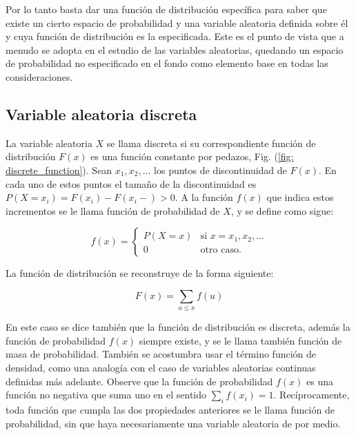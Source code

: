 Por lo tanto basta dar una función de distribución específica para saber que
existe un cierto espacio de probabilidad y una variable aleatoria definida sobre
él y cuya función de distribución es la especificada. Este es el punto de vista
que a menudo se adopta en el estudio de las variables aleatorias, quedando un
espacio de probabilidad no especificado en el fondo como elemento base en todas
las consideraciones.


\subsection{Variable aleatoria discreta}

\begin{tcolorbox}[colback=gray!5!white,colframe=gray!60!black,title=Definición: Variable aleatoria discreta]
La variable aleatoria $X$ se llama discreta si su correspondiente función de
distribución $F(x)$ es una función constante por pedazos, Fig. (\ref{fig: discrete_function}). Sean $x_1, x_2 , ...$
los puntos de discontinuidad de $F(x)$. En cada uno de estos puntos el tamaño de
la discontinuidad es $P(X = x_i ) = F (x_i ) - F (x_i -) > 0$. A la función
$f(x)$ que indica estos incrementos se le llama función de probabilidad de $X$,
y se define como sigue:

\begin{equation}
    f(x) =
    \left\lbrace
    \begin{array}{ll} 
        P(X=x)  & \text{si } x = x_1, x_2, ... \\
        0       & \text{otro caso.}
    \end{array}\right.
\end{equation}

La función de distribución se reconstruye de la forma siguiente:

\begin{equation}
    F(x) = \sum_{u \leq x} f(u)
\end{equation}

\end{tcolorbox}

En este caso se dice también que la función de distribución es discreta, además
la función de probabilidad $f(x)$ siempre existe, y se le llama también función
de masa de probabilidad. También se acostumbra usar el término función de
densidad, como una analogía con el caso de variables aleatorias continuas
definidas más adelante. Observe que la función de probabilidad $f(x)$ es una
función no negativa que suma uno en el sentido $\sum_{i} f(x_i) = 1$.
Recíprocamente, toda función que cumpla las dos propiedades anteriores se le
llama función de probabilidad, sin que haya necesariamente una variable
aleatoria de por medio.

